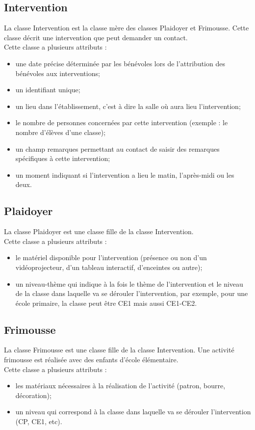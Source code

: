 \documentclass[asi, sansVersion]{picInsa}
\begin{document}
\subsection*{Intervention}
La classe Intervention est la classe mère des classes Plaidoyer et Frimousse. Cette classe décrit une intervention que peut demander un contact. \\
Cette classe a plusieurs attributs :
\begin{itemize}
\item une date précise déterminée par les bénévoles lors de l'attribution des bénévoles aux interventions;
\item un identifiant unique;
\item un lieu dans l'établissement, c'est à dire la salle où aura lieu l'intervention;
\item le nombre de personnes concernées par cette intervention (exemple : le nombre d'élèves d'une classe);
\item un champ remarques permettant au contact de saisir des remarques spécifiques à cette intervention;
\item un moment indiquant si l'intervention a lieu le matin, l'après-midi ou les deux.
\end{itemize}

\subsection*{Plaidoyer}
La classe Plaidoyer est une classe fille de la classe Intervention. \\
Cette classe a plusieurs attributs : 
\begin{itemize}
\item le matériel disponible pour l'intervention (présence ou non d'un vidéoprojecteur, d'un tableau interactif, d'enceintes ou autre);
\item un niveau-thème qui indique à la fois le thème de l'intervention et le niveau de la classe dans laquelle va se dérouler l'intervention, par exemple, pour une école primaire, la classe peut être CE1 mais aussi CE1-CE2.
\end{itemize}

\subsection*{Frimousse}
La classe Frimousse est une classe fille de la classe Intervention. Une activité frimousse est réalisée avec des enfants d'école élémentaire. \\
Cette classe a plusieurs attributs :
\begin{itemize}
\item les matériaux nécessaires à la réalisation de l'activité (patron, bourre, décoration);
\item un niveau qui correspond à la classe dans laquelle va se dérouler l'intervention (CP, CE1, etc).
\end{itemize}
\end{document}
